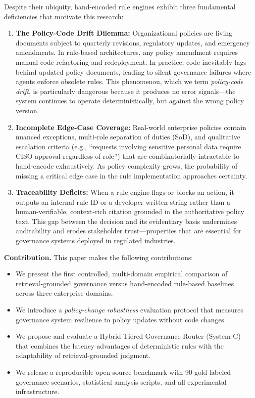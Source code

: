 \documentclass[sigconf,screen]{acmart}
\begin{document}
Despite their ubiquity, hand-encoded rule engines exhibit three fundamental deficiencies that motivate this research:

\begin{enumerate}[leftmargin=*]
    \item \textbf{The Policy-Code Drift Dilemma:} Organizational policies are living documents subject to quarterly revisions, regulatory updates, and emergency amendments. In rule-based architectures, any policy amendment requires manual code refactoring and redeployment. In practice, code inevitably lags behind updated policy documents, leading to silent governance failures where agents enforce obsolete rules. This phenomenon, which we term \emph{policy-code drift}, is particularly dangerous because it produces no error signals---the system continues to operate deterministically, but against the wrong policy version.
    
    \item \textbf{Incomplete Edge-Case Coverage:} Real-world enterprise policies contain nuanced exceptions, multi-role separation of duties (SoD), and qualitative escalation criteria (e.g., ``requests involving sensitive personal data require CISO approval regardless of role'') that are combinatorially intractable to hand-encode exhaustively. As policy complexity grows, the probability of missing a critical edge case in the rule implementation approaches certainty.
    
    \item \textbf{Traceability Deficits:} When a rule engine flags or blocks an action, it outputs an internal rule ID or a developer-written string rather than a human-verifiable, context-rich citation grounded in the authoritative policy text. This gap between the decision and its evidentiary basis undermines auditability and erodes stakeholder trust---properties that are essential for governance systems deployed in regulated industries.
\end{enumerate}

\noindent\textbf{Contribution.} This paper makes the following contributions:
\begin{itemize}[leftmargin=*]
    \item We present the first controlled, multi-domain empirical comparison of retrieval-grounded governance versus hand-encoded rule-based baselines across three enterprise domains.
    \item We introduce a \emph{policy-change robustness} evaluation protocol that measures governance system resilience to policy updates without code changes.
    \item We propose and evaluate a Hybrid Tiered Governance Router (System C) that combines the latency advantages of deterministic rules with the adaptability of retrieval-grounded judgment.
    \item We release a reproducible open-source benchmark with 90 gold-labeled governance scenarios, statistical analysis scripts, and all experimental infrastructure.
\end{itemize}
\end{document}
